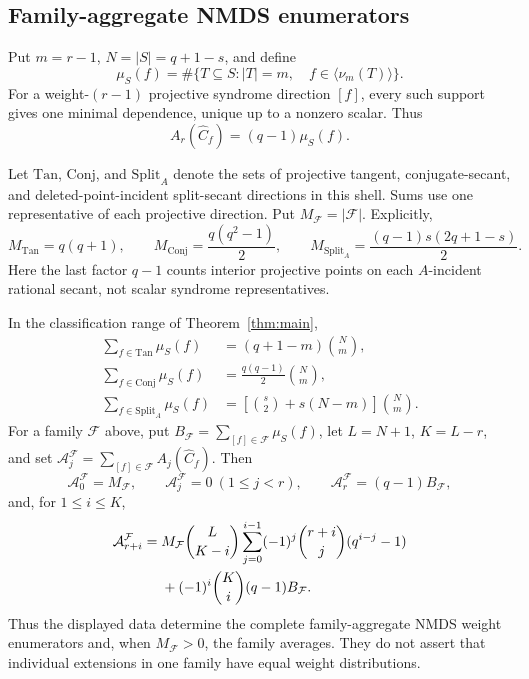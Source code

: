 \subsection{Family-aggregate NMDS enumerators}

Put \(m=r-1\), \(N=|S|=q+1-s\), and define
\[
 \mu_S(f)=\#\{T\subseteq S:|T|=m,\quad
                    f\in\langle\nu_m(T)\rangle\}.
\]
For a weight-\((r-1)\) projective syndrome direction \([f]\), every such
support gives one minimal dependence, unique up to a nonzero scalar.  Thus
\begin{equation}\label{eq:nmds-minimum-coefficient}
 A_r(\widehat C_f)=(q-1)\mu_S(f).
\end{equation}

Let \(\mathrm{Tan}\), \(\mathrm{Conj}\), and \(\mathrm{Split}_A\) denote
the sets of projective tangent, conjugate-secant, and deleted-point-incident
split-secant directions in this shell.  Sums use one representative of each
projective direction.  Put \(M_{\mathcal F}=|\mathcal F|\).  Explicitly,
\[
 M_{\mathrm{Tan}}=q(q+1),\qquad
 M_{\mathrm{Conj}}=\frac{q(q^2-1)}2,\qquad
 M_{\mathrm{Split}_A}=\frac{(q-1)s(2q+1-s)}2.
\]
Here the last factor \(q-1\) counts interior projective points on each
\(A\)-incident rational secant, not scalar syndrome representatives.

\begin{theorem}
\label{thm:family-aggregate-nmds}%
%
In the classification range of Theorem~\ref{thm:main},
\begin{align}
 \sum_{f\in\mathrm{Tan}}\mu_S(f)
   &=(q+1-m)\binom Nm,\label{eq:aggregate-tangent}\\
 \sum_{f\in\mathrm{Conj}}\mu_S(f)
   &=\frac{q(q-1)}2\binom Nm,\label{eq:aggregate-conjugate}\\
 \sum_{f\in\mathrm{Split}_A}\mu_S(f)
   &=\left[\binom s2+s(N-m)\right]\binom Nm.
   \label{eq:aggregate-split}
\end{align}
For a family \(\mathcal F\) above, put
\(B_{\mathcal F}=\sum_{[f]\in\mathcal F}\mu_S(f)\), let
\(L=N+1\), \(K=L-r\), and set
\(\mathcal A_j^{\mathcal F}=\sum_{[f]\in\mathcal F}
A_j(\widehat C_f)\).  Then
\[
 \mathcal A_0^{\mathcal F}=M_{\mathcal F},\qquad
 \mathcal A_j^{\mathcal F}=0\ (1\leq j<r),\qquad
 \mathcal A_r^{\mathcal F}=(q-1)B_{\mathcal F},
\]
and, for \(1\leq i\leq K\),
\begin{align}
 \mathcal A_{r+i}^{\mathcal F}
 ={}&M_{\mathcal F}\binom{L}{K-i}
 \sum_{j=0}^{i-1}(-1)^j\binom{r+i}{j}(q^{i-j}-1)\notag\\
 &+(-1)^i\binom Ki(q-1)B_{\mathcal F}.
 \label{eq:aggregate-nmds-enumerator}
\end{align}
Thus the displayed data determine the complete family-aggregate NMDS weight
enumerators and, when \(M_{\mathcal F}>0\), the family averages.  They do not
assert that individual extensions in one family have equal weight
distributions.
\end{theorem}

